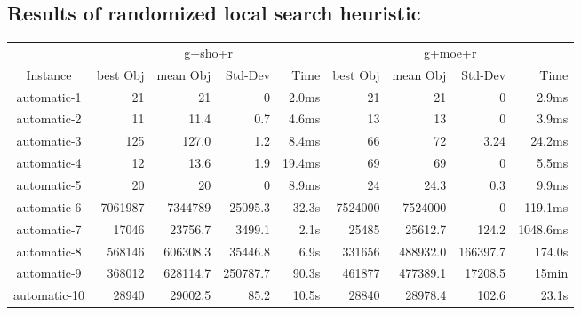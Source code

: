 \documentclass[11pt]{article}
\begin{document}
\subsection{Results of randomized local search heuristic}
{

\center
\begin{tabular}{c|rrrr|rrrr}
             & \multicolumn{4}{c}{g+sho+r}               & \multicolumn{4}{c}{g+moe+r}  \\
Instance     & best Obj & mean Obj & Std-Dev & Time      &  best Obj & mean Obj & Std-Dev & Time          \\
\hline
automatic-1  & 21       & 21       & 0       & 2.0ms     &  21       &  21      & 0       & 2.9ms             \\
automatic-2  & 11       & 11.4     & 0.7     & 4.6ms     &  13       &  13      & 0       & 3.9ms           \\
automatic-3  & 125      & 127.0    & 1.2     & 8.4ms     &  66       &  72      & 3.24    & 24.2ms         \\
automatic-4  & 12       & 13.6     & 1.9     & 19.4ms    &  69       &  69      & 0       & 5.5ms            \\
automatic-5  & 20       & 20       & 0       & 8.9ms     &  24       &  24.3    & 0.3     & 9.9ms           \\
automatic-6  & 7061987  & 7344789  & 25095.3 & 32.3s     &  7524000  &  7524000 & 0       & 119.1ms           \\
automatic-7  & 17046    & 23756.7  & 3499.1  & 2.1s      &  25485    &  25612.7 & 124.2   & 1048.6ms     \\
automatic-8  & 568146   & 606308.3 & 35446.8 & 6.9s      &  331656   &  488932.0& 166397.7& 174.0s     \\
automatic-9  & 368012   & 628114.7 & 250787.7& 90.3s     &  461877   &  477389.1& 17208.5 & 15min      \\
automatic-10 & 28940    & 29002.5  & 85.2    & 10.5s     &  28840    &  28978.4 & 102.6   & 23.1s      \\
\end{tabular}

}
\end{document}
